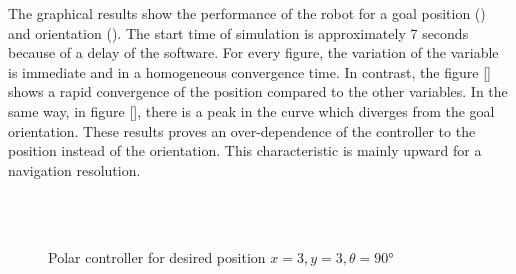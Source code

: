 \documentclass[conference]{IEEEtran}
\begin{document}
The graphical results show the performance of the robot for a goal position () and orientation (). The start time of simulation is approximately 7 seconds because of a delay of the software. For every figure, the variation of the variable is immediate and in a homogeneous convergence time. In contrast, the figure []  shows a rapid convergence of the position compared to the other variables. In the same way, in figure [], there is a peak in the curve which diverges from the goal orientation. These results proves an over-dependence of the controller to the position instead of the orientation. This characteristic is mainly upward for a navigation resolution.

\begin{figure}
	\centering
	~\\
	~
	\caption{Polar controller for desired position $x=3, y=3, \theta=90°$} \label{f:polar}
\end{figure}
\end{document}
